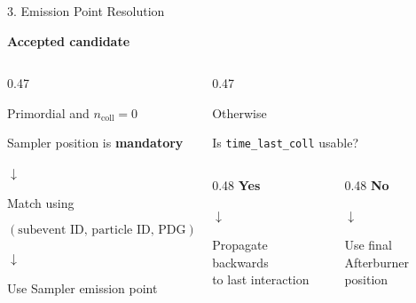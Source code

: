 \documentclass{beamer}
\begin{document}
\begin{frame}{3. Emission Point Resolution}
\scriptsize

\begin{center}
\textbf{Accepted candidate}
\end{center}
\vspace{-0.6em}

\begin{columns}[T]

\begin{column}{0.47\textwidth}
\begin{block}{Primordial and $n_{\mathrm{coll}}=0$}
\begin{center}
Sampler position is \textbf{mandatory}

$\downarrow$

Match using

\[
(\text{subevent ID},\,\text{particle ID},\,\text{PDG})
\]

$\downarrow$

Use Sampler emission point
\end{center}
\end{block}
\end{column}

\begin{column}{0.47\textwidth}
\begin{block}{Otherwise}
\begin{center}
Is \texttt{time\_last\_coll} usable?
\end{center}
\vspace{0.2em}

\begin{columns}[T,onlytextwidth]
\begin{column}{0.48\textwidth}
\centering
\textbf{Yes}

$\downarrow$

Propagate backwards\\
to last interaction
\end{column}
\begin{column}{0.48\textwidth}
\centering
\textbf{No}

$\downarrow$

Use final\\
Afterburner position
\end{column}
\end{columns}
\end{block}
\end{column}

\end{columns}


\end{frame}
\end{document}
